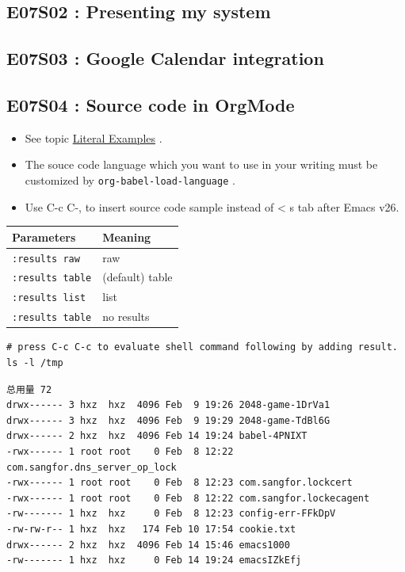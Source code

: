 \documentclass[11pt]{article}
\begin{document}
\subsection{E07S02 : Presenting my system}
\label{sec:org4b6f57d}
\subsection{E07S03 : Google Calendar integration}
\label{sec:org6091f1c}
\subsection{E07S04 : Source code in OrgMode}
\label{sec:orga22d68d}
\begin{itemize}
\item See topic \href{https://orgmode.org/manual/Literal-Examples.html}{Literal Examples} .
\item The souce code language which you want to use in your writing must be
customized by \texttt{org-babel-load-language} .
\item Use  C-c C-,  to insert source code sample
instead of  < s tab  after Emacs v26.
\end{itemize}

\begin{center}
\begin{tabular}{ll}
Parameters & Meaning\\
\hline
\texttt{:results raw} & raw\\
\texttt{:results table} & (default) table\\
\texttt{:results list} & list\\
\texttt{:results table} & no results\\
\end{tabular}
\end{center}

\begin{verbatim}
# press C-c C-c to evaluate shell command following by adding result. 
ls -l /tmp
\end{verbatim}

\begin{verbatim}
总用量 72
drwx------ 3 hxz  hxz  4096 Feb  9 19:26 2048-game-1DrVa1
drwx------ 3 hxz  hxz  4096 Feb  9 19:29 2048-game-TdBl6G
drwx------ 2 hxz  hxz  4096 Feb 14 19:24 babel-4PNIXT
-rwx------ 1 root root    0 Feb  8 12:22 com.sangfor.dns_server_op_lock
-rwx------ 1 root root    0 Feb  8 12:23 com.sangfor.lockcert
-rwx------ 1 root root    0 Feb  8 12:22 com.sangfor.lockecagent
-rw------- 1 hxz  hxz     0 Feb  8 12:23 config-err-FFkDpV
-rw-rw-r-- 1 hxz  hxz   174 Feb 10 17:54 cookie.txt
drwx------ 2 hxz  hxz  4096 Feb 14 15:46 emacs1000
-rw------- 1 hxz  hxz     0 Feb 14 19:24 emacsIZkEfj
\end{verbatim}
\end{document}
